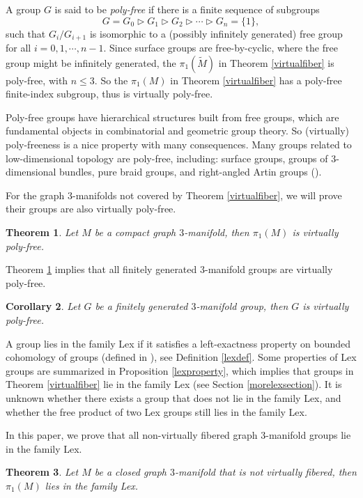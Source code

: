 \documentclass{amsart}
\numberwithin{equation}{section}
\newtheorem{theorem}{Theorem}[section]
\newtheorem{corollary}[theorem]{Corollary}
\theoremstyle{definition}
\begin{document}
A group $G$ is said to be {\it poly-free} if there is a finite sequence of subgroups 
$$G=G_0\vartriangleright G_1\vartriangleright G_2 \vartriangleright\cdots \vartriangleright G_n=\{1\},$$ such that $G_i/G_{i+1}$ is isomorphic to a (possibly infinitely generated) free group for all $i=0,1,\cdots,n-1$. Since surface groups are free-by-cyclic, where the free group might be infinitely generated, the $\pi_1(\tilde{M})$ in Theorem \ref{virtualfiber} is poly-free, with $n\leq 3$. So the $\pi_1(M)$ in Theorem \ref{virtualfiber} has a poly-free finite-index subgroup, thus is virtually poly-free.

Poly-free groups have hierarchical structures built from free groups, which are fundamental objects in combinatorial and geometric group theory. So (virtually) poly-freeness is a nice property with many consequences. Many groups related to low-dimensional topology are poly-free, including: surface groups, groups of $3$-dimensional bundles, pure braid groups, and right-angled Artin groups (\cite{HS}). 

For the graph $3$-manifolds not covered by Theorem \ref{virtualfiber}, we will prove their groups are also virtually poly-free.
\begin{theorem}\label{polyfree}
Let $M$ be a compact graph $3$-manifold, then $\pi_1(M)$ is virtually poly-free.
\end{theorem}

Theorem \ref{polyfree} implies that all finitely generated $3$-manifold groups are virtually poly-free.
\begin{corollary}\label{morepolyfree}
Let $G$ be a finitely generated $3$-manifold group, then $G$ is virtually poly-free.
\end{corollary}

A group lies in the family Lex if it satisfies a left-exactness property on bounded cohomology of groups (defined in \cite{Bou}), see Definition \ref{lexdef}. Some properties of Lex groups are summarized in Proposition \ref{lexproperty}, which implies that groups in Theorem \ref{virtualfiber} lie in the family Lex (see Section \ref{morelexsection}). It is unknown whether there exists a group that does not lie in the family Lex, and whether the free product of two Lex groups still lies in the family Lex.

In this paper, we prove that all non-virtually fibered graph $3$-manifold groups lie in the family Lex.

\begin{theorem}\label{lex}
Let $M$ be a closed graph $3$-manifold that is not virtually fibered, then $\pi_1(M)$ lies in the family Lex.
\end{theorem}
\end{document}
